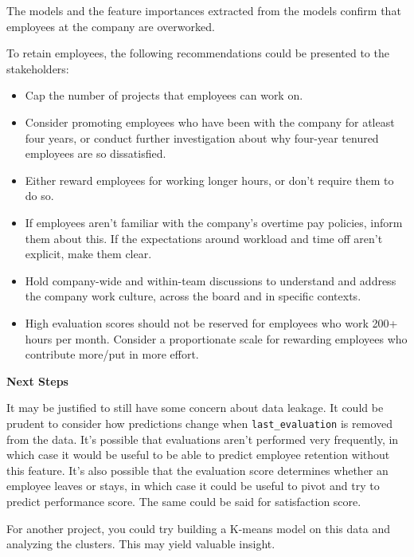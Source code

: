 \documentclass[
]{article}
\providecommand{\tightlist}{%
  \setlength{\itemsep}{0pt}\setlength{\parskip}{0pt}}
\begin{document}
The models and the feature importances extracted from the models confirm
that employees at the company are overworked.

To retain employees, the following recommendations could be presented to
the stakeholders:

\begin{itemize}
\tightlist
\item
  Cap the number of projects that employees can work on.
\item
  Consider promoting employees who have been with the company for
  atleast four years, or conduct further investigation about why
  four-year tenured employees are so dissatisfied.
\item
  Either reward employees for working longer hours, or don't require
  them to do so.
\item
  If employees aren't familiar with the company's overtime pay policies,
  inform them about this. If the expectations around workload and time
  off aren't explicit, make them clear.
\item
  Hold company-wide and within-team discussions to understand and
  address the company work culture, across the board and in specific
  contexts.
\item
  High evaluation scores should not be reserved for employees who work
  200+ hours per month. Consider a proportionate scale for rewarding
  employees who contribute more/put in more effort.
\end{itemize}

\textbf{Next Steps}

It may be justified to still have some concern about data leakage. It
could be prudent to consider how predictions change when
\texttt{last\_evaluation} is removed from the data. It's possible that
evaluations aren't performed very frequently, in which case it would be
useful to be able to predict employee retention without this feature.
It's also possible that the evaluation score determines whether an
employee leaves or stays, in which case it could be useful to pivot and
try to predict performance score. The same could be said for
satisfaction score.

For another project, you could try building a K-means model on this data
and analyzing the clusters. This may yield valuable insight.
\end{document}
